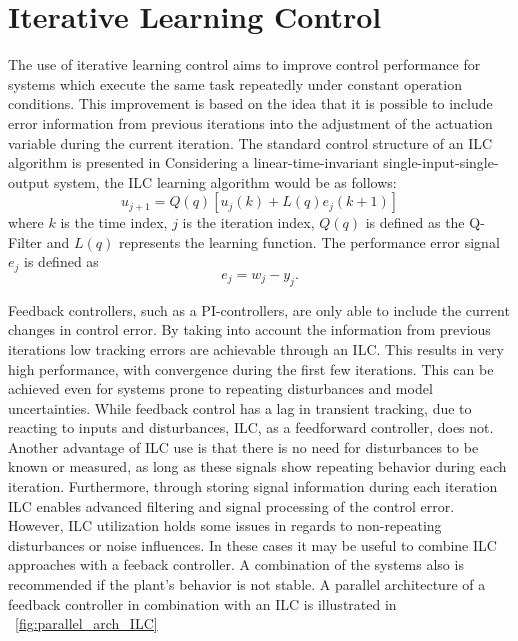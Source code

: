 \section{Iterative Learning Control}
The use of iterative learning control aims to improve control performance for systems which execute the same task repeatedly under constant operation conditions. This improvement is based on the idea that it is possible to include error information from previous iterations into the adjustment of the actuation variable during the current iteration.
The standard control structure of an ILC algorithm is presented in %
Considering a linear-time-invariant single-input-single-output system, the ILC learning algorithm would be as follows:
\begin{equation}
    u_{j+1}  = Q(q)[u_{j}(k)+L(q)e_{j}(k+1)]
 \label{eq:ILC_standard}
\end{equation}
where $k$ is the time index, $j$ is the iteration index, $Q(q)$ is defined as the Q-Filter and $L(q)$ represents the learning function. The performance error signal $e_{j}$ is defined as
\begin{equation}
    e_{j}  = w_{j}-y_{j}.
 \label{eq:perf_error}
\end{equation}

 Feedback controllers, such as a PI-controllers, are only able to include the current changes in control error. By taking into account the information from previous iterations low tracking errors are achievable through an ILC. This results in very high performance, with convergence during the first few iterations. This can be achieved even for systems prone to repeating disturbances and model uncertainties. While feedback control has a lag in transient tracking, due to reacting to inputs and disturbances, ILC, as a feedforward controller, does not. Another advantage of ILC use is that there is no need for disturbances to be known or measured, as long as these signals show repeating behavior during each iteration. Furthermore, through storing signal information during each iteration ILC enables advanced filtering and signal processing of the control error. However, ILC utilization holds some issues in regards to non-repeating disturbances or noise influences. In these cases it may be useful to combine ILC approaches with a feeback controller. A combination of the systems also is recommended if the plant's behavior is not stable. \cite{ILC2} A parallel architecture of a feedback controller in combination with an ILC is illustrated in \figurename~\ref{fig:parallel_arch_ILC}

